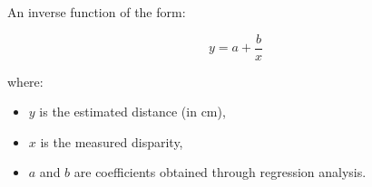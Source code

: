 An inverse function of the form:

\[
y = a + \frac{b}{x}
\]

where:
\begin{itemize}
	\item \( y \) is the estimated distance (in cm),
	\item \( x \) is the measured disparity,
	\item \( a \) and \( b \) are coefficients obtained through regression analysis.
\end{itemize}








